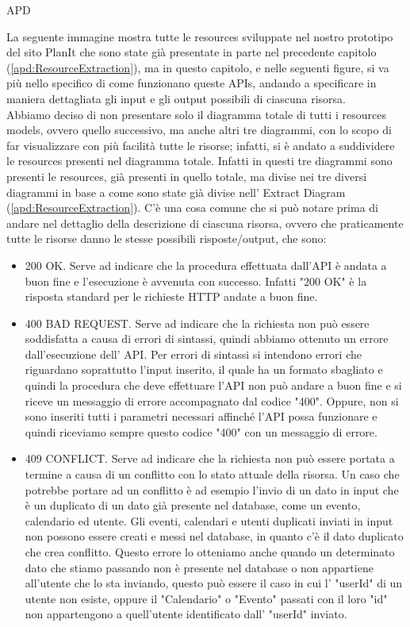 \begin{listaPersonale} {APD}
\begin{listaPersonale2}[APD]{}
        La seguente immagine mostra tutte le resources sviluppate nel nostro prototipo del sito PlanIt che sono state già presentate in parte nel precedente capitolo (\ref{apd:ResourceExtraction}), ma in questo capitolo, e nelle seguenti figure, si va più nello specifico di come funzionano queste APIs, andando a specificare in maniera dettagliata gli input e gli output possibili di ciascuna risorsa. \\
        Abbiamo deciso di non presentare solo il diagramma totale di tutti i resources models, ovvero quello successivo, ma anche altri tre diagrammi, con lo scopo di far visualizzare con più facilità tutte le risorse; infatti, si è andato a suddividere le resources presenti nel diagramma totale. Infatti in questi tre diagrammi sono presenti le resources, già presenti in quello totale, ma divise nei tre diversi diagrammi in base a come sono state già divise nell' Extract Diagram (\ref{apd:ResourceExtraction}).
        C'è una cosa comune che si può notare prima di andare nel dettaglio della descrizione di ciascuna risorsa, ovvero che praticamente tutte le risorse danno le stesse possibili risposte/output, che sono:
        \begin{itemize}
            \item 200 OK. Serve ad indicare che la procedura effettuata dall'API è andata a buon fine e l'esecuzione è avvenuta con successo. Infatti "200 OK" è la risposta standard per le richieste HTTP andate a buon fine.
            \item 400 BAD REQUEST. Serve ad indicare che la richiesta non può essere soddisfatta a causa di errori di sintassi, quindi abbiamo ottenuto un errore dall'esecuzione dell' API. Per errori di sintassi si intendono errori che riguardano soprattutto l'input inserito, il quale ha un formato sbagliato e quindi la procedura che deve effettuare l'API non può andare a buon fine e si riceve un messaggio di errore accompagnato dal codice "400". Oppure, non si sono inseriti tutti i parametri necessari affinché l'API possa funzionare e quindi riceviamo sempre questo codice "400" con un messaggio di errore.
            \item 409 CONFLICT. Serve ad indicare che la richiesta non può essere portata a termine a causa di un conflitto con lo stato attuale della risorsa. Un caso che potrebbe portare ad un conflitto è ad esempio l'invio di un dato in input che è un duplicato di un dato già presente nel database, come un evento, calendario ed utente. Gli eventi, calendari e utenti duplicati inviati in input non possono essere creati e messi nel database, in quanto c'è il dato duplicato che crea conflitto. Questo errore lo otteniamo anche quando un determinato dato che stiamo passando non è presente nel database o non appartiene all'utente che lo sta inviando, questo può essere il caso in cui l' "userId" di un utente non esiste, oppure il "Calendario" o "Evento" passati con il loro "id" non appartengono a quell'utente identificato dall' "userId" inviato.

\end{itemize}
\end{listaPersonale2}
\end{listaPersonale}
